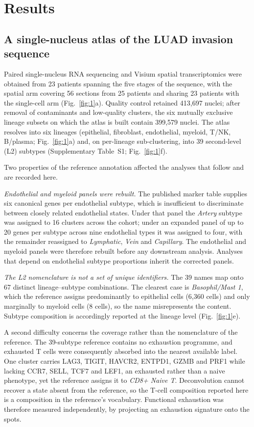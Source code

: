 \section{Results}

\subsection{A single-nucleus atlas of the LUAD invasion sequence}

Paired single-nucleus RNA sequencing and Visium spatial transcriptomics were obtained from
23 patients spanning the five stages of the sequence, with the spatial arm covering 56
sections from 25 patients and sharing 23 patients with the single-cell arm
(Fig.~\ref{fig:1}a). Quality control retained 413,697 nuclei; after removal of contaminants
and low-quality clusters, the six mutually exclusive lineage subsets on which the atlas is
built contain 399,579 nuclei. The atlas resolves into six
lineages (epithelial, fibroblast, endothelial, myeloid, T/NK, B/plasma;
Fig.~\ref{fig:1}a) and, on per-lineage sub-clustering, into 39 second-level (L2) subtypes
(Supplementary Table~S1; Fig.~\ref{fig:1}f).

Two properties of the reference annotation affected the analyses that follow and are
recorded here.

\emph{Endothelial and myeloid panels were rebuilt.} The published marker table supplies six
canonical genes per endothelial subtype, which is insufficient to discriminate between
closely related endothelial states. Under that panel the \emph{Artery} subtype was assigned
to 16 clusters across the cohort; under an expanded panel of up to 20 genes per subtype
across nine endothelial types it was assigned to four, with the remainder reassigned to
\emph{Lymphatic}, \emph{Vein} and \emph{Capillary}. The endothelial and myeloid panels were
therefore rebuilt before any downstream analysis. Analyses that depend on endothelial
subtype proportions inherit the corrected panels.

\emph{The L2 nomenclature is not a set of unique identifiers.} The 39 names map onto 67
distinct lineage--subtype combinations. The clearest case is \emph{Basophil/Mast 1}, which
the reference assigns predominantly to epithelial cells (6,360 cells) and only marginally
to myeloid cells (8 cells), so the name misrepresents the content. Subtype composition is
accordingly reported at the lineage level (Fig.~\ref{fig:1}e).

A second difficulty concerns the coverage rather than the nomenclature of the reference. The
39-subtype reference contains no exhaustion programme, and exhausted T cells were
consequently absorbed into the nearest available label. One cluster carries LAG3, TIGIT,
HAVCR2, ENTPD1, GZMB and PRF1 while lacking CCR7, SELL, TCF7 and LEF1, an exhausted rather
than a naive phenotype, yet the reference assigns it to \emph{CD8+ Naive T}. Deconvolution
cannot recover a state absent from the reference, so the T-cell composition reported here is
a composition in the reference's vocabulary. Functional exhaustion was therefore measured
independently, by projecting an exhaustion signature
\citep{thommen2018,wherry2015exhaustion} onto the spots.

